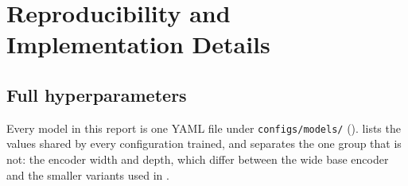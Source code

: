 %

\section{Reproducibility and Implementation Details}
\label{app:repro}

\subsection{Full hyperparameters}
\label{app:hparams}

Every model in this report is one YAML file under \texttt{configs/models/}
().  lists the values shared by every configuration
trained, and separates the one group that is not: the encoder width and depth, which differ between
the wide base encoder and the smaller variants used in .


